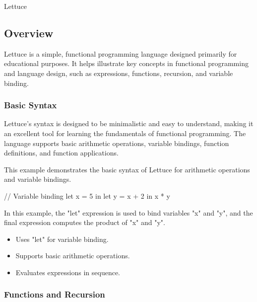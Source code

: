 \begin{notes}{Lettuce}
    \subsection*{Overview}

    Lettuce is a simple, functional programming language designed primarily for educational purposes. It helps illustrate key concepts in functional programming and language design, such as expressions, 
    functions, recursion, and variable binding. 
    
    \subsubsection*{Basic Syntax}
    
    Lettuce's syntax is designed to be minimalistic and easy to understand, making it an excellent tool for learning the fundamentals of functional programming. The language supports basic arithmetic 
    operations, variable bindings, function definitions, and function applications.
    
    \begin{highlight}
    
        This example demonstrates the basic syntax of Lettuce for arithmetic operations and variable bindings.
    
    \begin{code}[Lettuce]
    // Variable binding
    let x = 5 in
    let y = x + 2 in
    x * y
    \end{code}
    
        In this example, the "let" expression is used to bind variables "x" and "y", and the final expression computes the product of "x" and "y".
    
        \begin{itemize}
            \item Uses "let" for variable binding.
            \item Supports basic arithmetic operations.
            \item Evaluates expressions in sequence.
        \end{itemize}
    
    \end{highlight}
    
    \subsubsection*{Functions and Recursion}
    

\end{notes}
